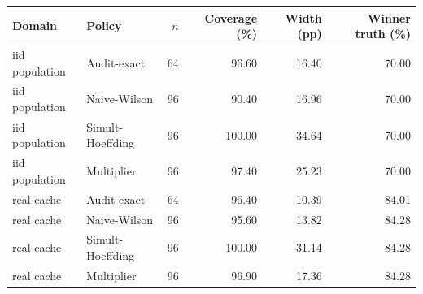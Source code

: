 \begin{tabular}{llrrrr}
\toprule
Domain & Policy & $n$ & Coverage (\%) & Width (pp) & Winner truth (\%) \\
\midrule
iid population & Audit-exact & 64 & 96.60 & 16.40 & 70.00 \\
iid population & Naive-Wilson & 96 & 90.40 & 16.96 & 70.00 \\
iid population & Simult-Hoeffding & 96 & 100.00 & 34.64 & 70.00 \\
iid population & Multiplier & 96 & 97.40 & 25.23 & 70.00 \\
real cache & Audit-exact & 64 & 96.40 & 10.39 & 84.01 \\
real cache & Naive-Wilson & 96 & 95.60 & 13.82 & 84.28 \\
real cache & Simult-Hoeffding & 96 & 100.00 & 31.14 & 84.28 \\
real cache & Multiplier & 96 & 96.90 & 17.36 & 84.28 \\
\bottomrule
\end{tabular}